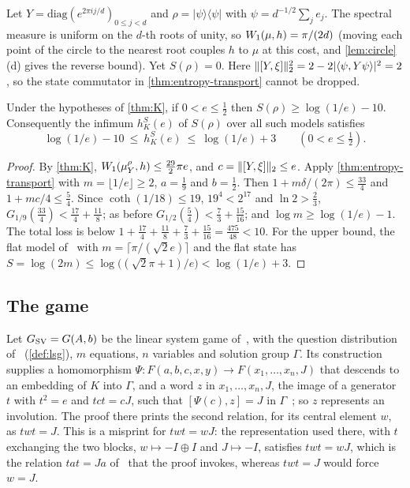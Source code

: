 \begin{example}\label{ex:clock}
Let $Y=\mathrm{diag}(e^{2\pi ij/d})_{0\le j<d}$ and $\rho=|\psi\rangle\langle\psi|$ with $\psi=d^{-1/2}\sum_je_j$. The spectral
measure is uniform on the $d$-th roots of unity, so $W_1(\mu,h)=\pi/(2d)$ (moving each point of the circle to the nearest
root couples $h$ to $\mu$ at this cost, and \cref{lem:circle}(d) gives the reverse bound). Yet $S(\rho)=0$. Here
$\lVert [Y,\xi]\rVert_2^2=2-2|\langle\psi,Y\psi\rangle|^2=2$, so the state commutator in \cref{thm:entropy-transport} cannot be dropped.
\end{example}

\begin{corollary}\label{cor:K-entropy}
Under the hypotheses of \cref{thm:K}, if $0<e\le\frac12$ then $S(\rho)\ge\log(1/e)-10$. Consequently the infimum
$h^S_K(e)$ of $S(\rho)$ over all such models satisfies
\[
\log(1/e)-10\ \le\ h^S_K(e)\ \le\ \log(1/e)+3\qquad(0<e\le\tfrac12).
\]
\end{corollary}

\begin{proof}
By \cref{thm:K}, $W_1(\mu^\rho_Y,h)\le\frac{29}2\pi e$, and $c=\lVert [Y,\xi]\rVert_2\le e$. Apply
\cref{thm:entropy-transport} with $m=\lfloor1/e\rfloor\ge2$, $a=\frac19$ and $b=\frac12$. Then $1+m\delta/(2\pi)\le\frac{33}4$ and
$1+mc/4\le\frac54$. Since $\coth(1/18)\le19$, $19^4<2^{17}$ and $\ln2>\frac23$, $G_{1/9}(\frac{33}4)<\frac{17}4+\frac{11}8$; as
before $G_{1/2}(\frac54)<\frac73+\frac{15}{16}$; and $\log m\ge\log(1/e)-1$. The total loss is below
$1+\frac{17}4+\frac{11}8+\frac73+\frac{15}{16}=\frac{475}{48}<10$. For the upper bound, the flat model of~\cite[Example~11.11]{DM-game} with
$m=\lceil\pi/(\sqrt2e)\rceil$ and the flat state has $S=\log(2m)\le\log\bigl((\sqrt2\pi+1)/e\bigr)<\log(1/e)+3$.
\end{proof}

\subsection{The game}\label{sec:transport-game}

Let $G_{\mathrm{SV}}=G(A,b)$ be the linear system game of~\cite[Theorem~1.1]{SV18}, with the question distribution of~\cite{SV18}
(\cref{def:lsg}), $m$ equations, $n$ variables and solution group $\Gamma$. Its construction~\cite[Propositions~6.1
and~6.2]{SV18} supplies a homomorphism $\Psi:F(a,b,c,x,y)\to F(x_1,\dots,x_n,J)$ that descends to an embedding of $K$
into $\Gamma$, and a word $z$ in $x_1,\dots,x_n,J$, the image of a generator $t$ with $t^2=e$ and $tct=cJ$, such that
$[\Psi(c),z]=J$ in $\Gamma$~\cite[proof of Proposition~6.2]{SV18}; so $z$ represents an involution. The proof there prints the
second relation, for its central element $w$, as $twt=J$. This is a misprint for $twt=wJ$: the representation used there,
with $t$ exchanging the two blocks, $w\mapsto-I\oplus I$ and $J\mapsto-I$, satisfies $twt=wJ$, which is the relation $tat=Ja$
of~\cite[Lemma~5.2]{Slo19} that the proof invokes, whereas $twt=J$ would force $w=J$.

